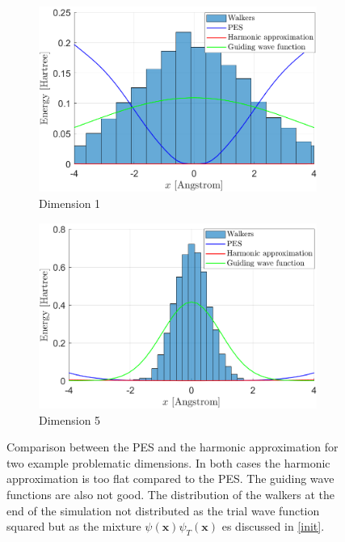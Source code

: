 \documentclass [12pt]{report}
\begin{document}
\begin{figure}[H]
\begin{subfigure}{0.5\textwidth}
\includegraphics[width=\linewidth]{walkers4.png} 
\caption{Dimension 1}
\label{dim1}
\end{subfigure}
\begin{subfigure}{0.5\textwidth}
\includegraphics[width=\linewidth]{walkers3.png}
\caption{Dimension 5}
\label{dim5}
\end{subfigure}
\caption{Comparison between the PES and the harmonic approximation for two example problematic dimensions. In both cases the harmonic approximation is too flat compared to the PES. The guiding wave functions are also not good. The distribution of the walkers at the end of the simulation not distributed as the trial wave function squared but as the mixture $\psi(\bm{x})\psi_T(\bm{x})$ es discussed in \ref{init}.}
\label{trialwf}
\end{figure}
\end{document}

